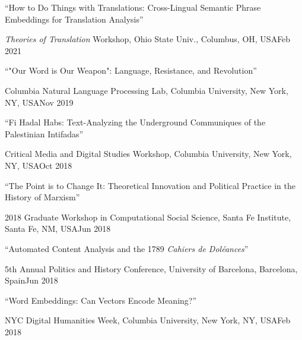 \documentclass[letterpaper,11pt]{article}
\begin{document}
\begin{minipage}{\textwidth}
``How to Do Things with Translations: Cross-Lingual Semantic Phrase Embeddings for Translation Analysis''

\begin{adjustwidth}{1cm}{}
	{\small \textsl{Theories of Translation} Workshop, Ohio State Univ., Columbus, OH, USA}\hfill {\small Feb 2021}\vspace{3mm}
\end{adjustwidth}
\end{minipage}
\begin{minipage}{\textwidth}
``"Our Word is Our Weapon": Language, Resistance, and Revolution''

\begin{adjustwidth}{1cm}{}
	{\small Columbia Natural Language Processing Lab, Columbia University, New York, NY, USA}\hfill {\small Nov 2019}\vspace{3mm}
\end{adjustwidth}
\end{minipage}
\begin{minipage}{\textwidth}
``Fi Hadal Habs: Text-Analyzing the Underground Communiques of the Palestinian Intifadas''

\begin{adjustwidth}{1cm}{}
	{\small Critical Media and Digital Studies Workshop, Columbia University, New York, NY, USA}\hfill {\small Oct 2018}\vspace{3mm}
\end{adjustwidth}
\end{minipage}
\begin{minipage}{\textwidth}
``The Point is to Change It: Theoretical Innovation and Political Practice in the History of Marxism''

\begin{adjustwidth}{1cm}{}
	{\small 2018 Graduate Workshop in Computational Social Science, Santa Fe Institute, Santa Fe, NM, USA}\hfill {\small Jun 2018}\vspace{3mm}
\end{adjustwidth}
\end{minipage}
\begin{minipage}{\textwidth}
``Automated Content Analysis and the 1789 \textit{Cahiers de Dol\'{e}ances}''

\begin{adjustwidth}{1cm}{}
	{\small 5th Annual Politics and History Conference, University of Barcelona, Barcelona, Spain}\hfill {\small Jun 2018}\vspace{3mm}
\end{adjustwidth}
\end{minipage}
\begin{minipage}{\textwidth}
``Word Embeddings: Can Vectors Encode Meaning?''

\begin{adjustwidth}{1cm}{}
	{\small NYC Digital Humanities Week, Columbia University, New York, NY, USA}\hfill {\small Feb 2018}\vspace{3mm}
\end{adjustwidth}
\end{minipage}
\end{document}

